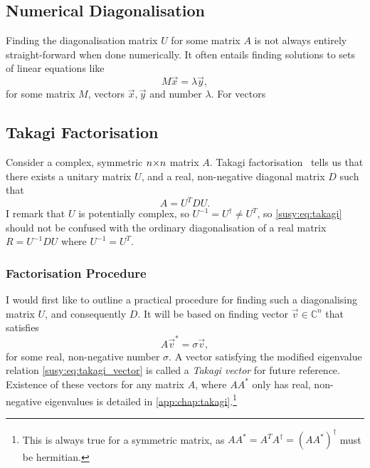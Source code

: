 \documentclass[../main.tex]{subfiles}
\begin{document}
\subsection{Numerical Diagonalisation}
Finding the diagonalisation matrix \(U\) for some matrix \(A\) is not always entirely straight-forward when done numerically.
It often entails finding solutions to sets of linear equations like
\begin{equation}
  M \vec{x} = \lambda \vec{y},
\end{equation}
for some matrix \(M\), vectors \(\vec{x}, \vec{y}\) and number \(\lambda\).
For vectors

\subsection{Takagi Factorisation}
Consider a complex, symmetric \(n{\times} n\) matrix \(A\).
Takagi factorisation~\cite{Horn} tells us that there exists a unitary matrix \(U\), and a real, non-negative diagonal matrix \(D\) such that
\begin{equation}
  \label{susy:eq:takagi}
  A = U^T D U.
\end{equation}
I remark that \(U\) is potentially complex, so \(U^{-1} = U^\dagger \neq U^T\), so \cref{susy:eq:takagi} should not be confused with the ordinary diagonalisation of a real matrix \(R = U^{-1} D U\) where \(U^{-1} = U^T\).


\subsubsection*{Factorisation Procedure}
I would first like to outline a practical procedure for finding such a diagonalising matrix \(U\), and consequently \(D\).
It will be based on finding vector \(\vec{v} \in  \mathbb{C}^n\) that satisfies
\begin{equation}
  \label{susy:eq:takagi_vector}
  A \vec{v}^* = \sigma \vec{v},
\end{equation}
for some real, non-negative number \(\sigma\).
A vector satisfying the modified eigenvalue relation \cref{susy:eq:takagi_vector} is called a \emph{Takagi vector} for future reference.
Existence of these vectors for any matrix \(A\), where \(AA^\ast\) only has real, non-negative eigenvalues is detailed in \cref{app:chap:takagi}.\footnote{This is always true for a symmetric matrix, as \(AA^\ast = A^T A^\dagger = (AA^\ast)^\dagger\) must be hermitian.}
\end{document}
